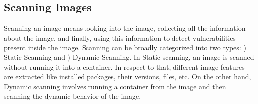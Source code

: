 \documentclass[a4paper,num-refs]{oup-contemporary}
\newcommand{\rom}[1]{\lowercase\expandafter{\romannumeral #1\relax}}
\newcommand{\TG}[1]{\color{blue}From Tristan: #1\color{black}}
\begin{document}
%
%
%
%


\subsection{Scanning Images}

Scanning an image means looking into the image, collecting all the information about the image, and
finally, using this information to detect vulnerabilities present inside the image.
Scanning can be broadly categorized into two types: \rom{1}) Static Scanning and \rom{2})
Dynamic Scanning.
In Static scanning, an image is scanned without running it into a container. In respect to that,
different image features are extracted like installed packages, their versions, files, etc.
On the other hand, Dynamic scanning involves running a container from the image and then scanning the
dynamic behavior of the image.
\end{document}
